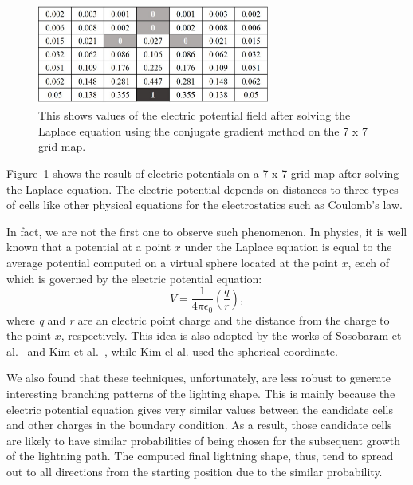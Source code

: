 \begin{figure}[t]
	\centering
	\includegraphics[width=3.0in]{fig/cgm_value_distribution}
	\caption{
This shows values of the electric potential field after solving the Laplace
equation using the conjugate gradient method on the 7 x 7 grid map.}
	\label{fig_cgm_value_distribution}
\end{figure}



Figure~\ref{fig_cgm_value_distribution} shows the result of electric potentials
on a 7 x 7 grid map after solving the Laplace equation. The electric potential
depends on distances to three types of cells like other physical
equations for the electrostatics such as Coulomb's law. 

In fact, we are not the first one to observe such phenomenon.  In physics, it
is well known that a potential at a point $x$ under the Laplace equation is
equal to the average potential computed on a virtual sphere located at the
point $x$, each of which is governed by the electric potential equation:
\begin{equation} 
V = 
	\frac{1}{4\pi\epsilon_{0}}(\frac{q}{r}),
	\label{eq_ep}
\end{equation}
where 
\textit{q} and \textit{r} are an electric point charge and the distance from
the charge to the point $x$, respectively.  This idea is also adopted by the
works of Sosobaram et al.~\cite{Sosobaram2001} and Kim et al.~\cite{}, while Kim el al. used the spherical coordinate.


We also found that these techniques, unfortunately, are less robust to generate interesting branching patterns of the lighting shape.
This is mainly because
the electric potential equation gives very similar values between the candidate
cells and other charges in the boundary condition.
As a result, 
those candidate cells are likely  to have  similar probabilities of being chosen for the 
subsequent growth of the lightning path. 
The computed final lightning shape, thus, tend to spread out to all directions
from the starting position due to the similar probability. 

